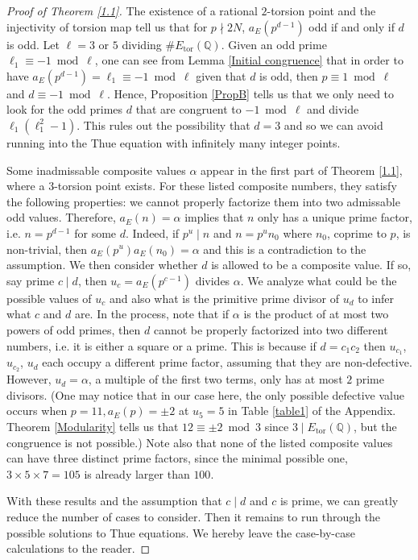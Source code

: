 \documentclass[12pt]{amsart}
\newcommand{\Q}{\mathbb{Q}}
\numberwithin{equation}{section}
\begin{document}
\begin{proof}[Proof of Theorem \ref{1.1}]
The existence of a rational $2$-torsion point and the injectivity of torsion map tell us that for $p\nmid 2N$, $a_E(p^{d-1})$ odd if and only if $d$ is odd. Let $\ell=3$ or $5$ dividing $\# E_{\text{tor}}(\Q)$. Given an odd prime $\ell_1\equiv -1\bmod \ell$, one can see from Lemma \ref{Initial congruence} that in order to have $a_E(p^{d-1})=\ell_1\equiv -1\bmod \ell$ given that $d$ is odd, then $p\equiv 1\bmod \ell$ and $d\equiv -1\bmod \ell$. Hence, Proposition \ref{PropB} tells us that we only need to look for the odd primes $d$ that are congruent to $-1\bmod \ell$ and divide $\ell_1(\ell_1^2-1)$. This rules out the possibility that $d=3$ and so we can avoid running into the Thue equation with infinitely many integer points.

Some inadmissable composite values $\alpha$ appear in the first part of Theorem \ref{1.1}, where a $3$-torsion point exists. For these listed composite numbers, they satisfy the following properties: we cannot properly factorize them into two admissable odd values. Therefore, $a_E(n)=\alpha$ implies that $n$ only has a unique prime factor, i.e. $n=p^{d-1}$ for some $d$. Indeed, if $p^u\mid n$ and $n=p^un_0$ where $n_0$, coprime to $p$, is non-trivial, then $a_E(p^u)a_E(n_0)=\alpha$ and this is a contradiction to the assumption. We then consider whether $d$ is allowed to be a composite value. If so, say prime $c\mid d$, then $u_c=a_E(p^{c-1})$ divides $\alpha$. We analyze what could be the possible values of $u_c$ and also what is the primitive prime divisor of $u_d$ to infer what $c$ and $d$ are. In the process, note that if $\alpha$ is the product of at most two powers of odd primes, then $d$ cannot be properly factorized into two different numbers, i.e. it is either a square or a prime. This is because if $d=c_1c_2$ then $u_{c_1}$, $u_{c_2}$, $u_d$ each occupy a different prime factor, assuming that they are non-defective. However, $u_d=\alpha$, a multiple of the first two terms, only has at most $2$ prime divisors. (One may notice that in our case here, the only possible defective value occurs when $p=11, a_E(p)=\pm 2$ at $u_5=5$ in Table \ref{table1} of the Appendix. Theorem \ref{Modularity} tells us that $12\equiv \pm 2\bmod 3$ since $3\mid E_{\text{tor}}(\Q)$, but the congruence is not possible.) Note also that none of the listed composite values can have three distinct prime factors, since the minimal possible one, $3\times 5\times 7=105$ is already larger than $100$.

With these results and the assumption that $c\mid d$ and $c$ is prime, we can greatly reduce the number of cases to consider. Then it remains to run through the possible solutions to Thue equations. We hereby leave the case-by-case calculations to the reader.
\end{proof}
\end{document}
